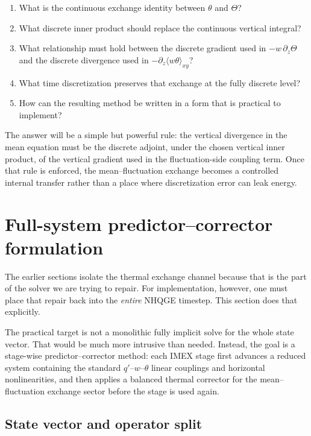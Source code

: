 \documentclass[11pt]{article}
\begin{document}
\begin{enumerate}[label=\arabic*.]
\item What is the continuous exchange identity between $\theta$ and $\Theta$?
\item What discrete inner product should replace the continuous vertical integral?
\item What relationship must hold between the discrete gradient used in $-w\,\partial_z\Theta$ and the discrete divergence used in $-\partial_z\langle w\theta\rangle_{xy}$?
\item What time discretization preserves that exchange at the fully discrete level?
\item How can the resulting method be written in a form that is practical to implement?
\end{enumerate}

The answer will be a simple but powerful rule: the vertical divergence in the mean equation must be the discrete adjoint, under the chosen vertical inner product, of the vertical gradient used in the fluctuation-side coupling term. Once that rule is enforced, the mean--fluctuation exchange becomes a controlled internal transfer rather than a place where discretization error can leak energy.

\section{Full-system predictor--corrector formulation}

The earlier sections isolate the thermal exchange channel because that is the
part of the solver we are trying to repair. For implementation, however, one
must place that repair back into the \emph{entire} NHQGE timestep. This section
does that explicitly.

The practical target is not a monolithic fully implicit solve for the whole
state vector. That would be much more intrusive than needed. Instead, the goal
is a stage-wise predictor--corrector method: each IMEX stage first advances a
reduced system containing the standard $q'$--$w$--$\theta$ linear couplings and
horizontal nonlinearities, and then applies a balanced thermal corrector for
the mean--fluctuation exchange sector before the stage is used again.

\subsection{State vector and operator split}
\end{document}
